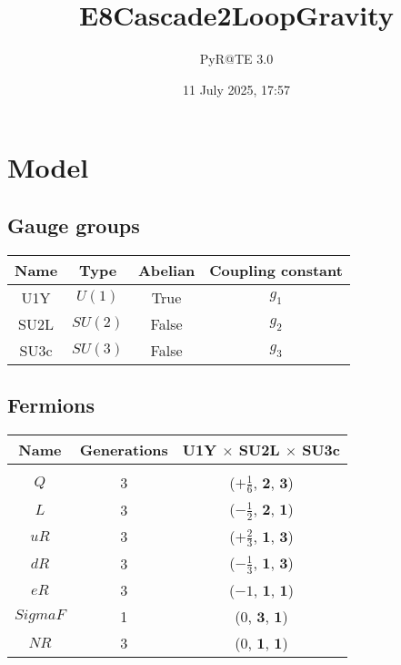 \documentclass[12pt]{article}
\title{E8Cascade2LoopGravity}
\author{PyR@TE 3.0}
\date{11 July 2025, 17:57}
\begin{document}
    \maketitle
    \tableofcontents
    \clearpage

\section{Model}

\subsection{Gauge groups}

\begin{table}[h]
\renewcommand{\arraystretch}{1.3}
\centering
\begin{tabular}{c@{\hskip .66cm}c@{\hskip .66cm}c@{\hskip .5cm}c}
\hline
Name & Type & Abelian & Coupling constant \\ \hline
U1Y & $U(1)$ & True & $g_{1}$ \\
SU2L & $SU(2)$ & False & $g_{2}$ \\
SU3c & $SU(3)$ & False & $g_{3}$ \\ \hline
\end{tabular}
\end{table}

\subsection{Fermions}

\begin{table}[h]
\renewcommand{\arraystretch}{1.15}
\centering
\begin{tabular}{c@{\hskip .66cm}c@{\hskip .66cm}c}
\hline
Name & Generations & U1Y $\times$ SU2L $\times$ SU3c\\ \hline \\ [-2ex]
$Q$ & 3 & ($+\frac{1}{6}$, $\mathbf{2}$, $\mathbf{3}$) \\[.2cm]
$L$ & 3 & ($- \frac{1}{2}$, $\mathbf{2}$, $\mathbf{1}$) \\[.2cm]
$uR$ & 3 & ($+\frac{2}{3}$, $\mathbf{1}$, $\mathbf{3}$) \\[.2cm]
$dR$ & 3 & ($- \frac{1}{3}$, $\mathbf{1}$, $\mathbf{3}$) \\[.2cm]
$eR$ & 3 & ($-1$, $\mathbf{1}$, $\mathbf{1}$) \\[.2cm]
$SigmaF$ & 1 & ($0$, $\mathbf{3}$, $\mathbf{1}$) \\[.2cm]
$NR$ & 3 & ($0$, $\mathbf{1}$, $\mathbf{1}$) \\[.1cm] \hline
\end{tabular}
\end{table}
\end{document}
